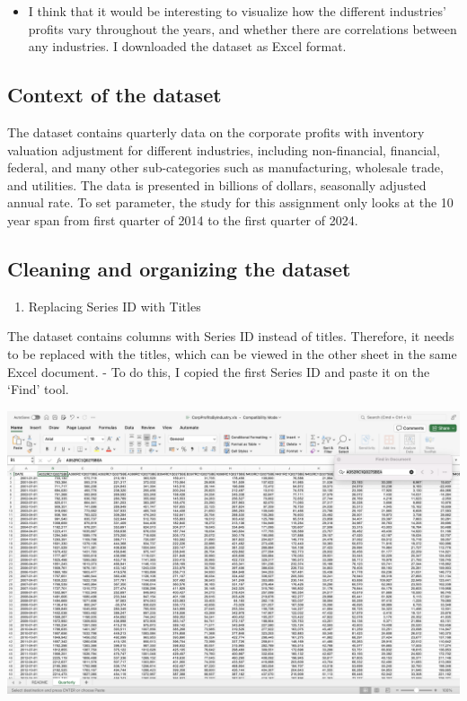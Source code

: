 \documentclass[
  letterpaper,
  DIV=11,
  numbers=noendperiod]{scrreprt}
\providecommand{\tightlist}{%
  \setlength{\itemsep}{0pt}\setlength{\parskip}{0pt}}\usepackage{longtable,booktabs,array}
\begin{document}
\begin{itemize}
\tightlist
\item
  I think that it would be interesting to visualize how the different
  industries' profits vary throughout the years, and whether there are
  correlations between any industries. I downloaded the dataset as Excel
  format.
\end{itemize}

\subsection{Context of the dataset}\label{context-of-the-dataset}

The dataset contains quarterly data on the corporate profits with
inventory valuation adjustment for different industries, including
non-financial, financial, federal, and many other sub-categories such as
manufacturing, wholesale trade, and utilities. The data is presented in
billions of dollars, seasonally adjusted annual rate. To set parameter,
the study for this assignment only looks at the 10 year span from first
quarter of 2014 to the first quarter of 2024.

\subsection{Cleaning and organizing the
dataset}\label{cleaning-and-organizing-the-dataset}

\begin{enumerate}
\def\labelenumi{\arabic{enumi}.}
\tightlist
\item
  Replacing Series ID with Titles
\end{enumerate}

The dataset contains columns with Series ID instead of titles.
Therefore, it needs to be replaced with the titles, which can be viewed
in the other sheet in the same Excel document. - To do this, I copied
the first Series ID and paste it on the `Find' tool.

\includegraphics{./Excel_1_Unit/Week1_Janice/Week 1/Week 1 Friday/Replacing_column_titles.png}
\end{document}
